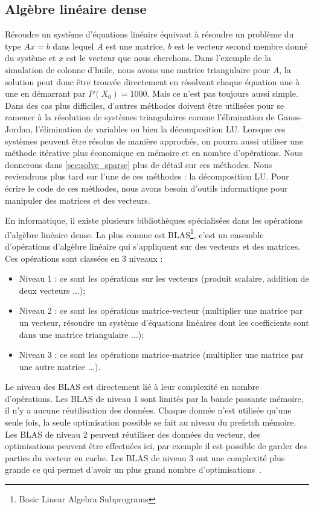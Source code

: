 \subsection{Algèbre linéaire dense}
Résoudre un système d'équations linéaire équivaut à résoudre un problème du type $Ax=b$ dans lequel $A$ est une matrice, $b$ est le vecteur second membre donné du système et $x$ est le vecteur que nous cherchons.
%
Dans l'exemple de la simulation de colonne d'huile, nous avons une matrice triangulaire pour $A$, la solution peut donc être trouvée directement en résolvant chaque équation une à une en démarrant par $P(X_0) = 1000$.
%
Mais ce n'est pas toujours aussi simple.
%
Dans des cas plus difficiles, d'autres méthodes doivent être utilisées pour se ramener à la résolution de systèmes triangulaires comme l'élimination de Gauss-Jordan, l'élimination de variables ou bien la décomposition LU.
%
Lorsque ces systèmes peuvent être résolus de manière approchés, on pourra aussi utiliser une méthode itérative plus économique en mémoire et en nombre d'opérations.
%
Nous donnerons dans \ref{sec:solve_sparse} plus de détail sur ces méthodes.
%
Nous reviendrons plus tard sur l'une de ces méthodes : la décomposition LU.
%
Pour écrire le code de ces méthodes, nous avons besoin d'outils informatique pour manipuler des matrices et des vecteurs.


En informatique, il existe plusieurs bibliothèques spécialisées dans les opérations d'algèbre linéaire dense.
%
La plus connue est BLAS\footnote{Basic Linear Algebra Subprograms}, c'est un ensemble d'opérations d'algèbre linéaire qui s'appliquent sur des vecteurs et des matrices.
%
Ces opérations sont classées en 3 niveaux :
\begin{itemize}
  \item Niveau 1 : ce sont les opérations sur les vecteurs (produit scalaire, addition de deux vecteurs ...);
  \item Niveau 2 : ce sont les opérations matrice-vecteur (multiplier une matrice par un vecteur, résoudre un système d'équations linéaires dont les coefficients sont dans une matrice triangulaire ...);
  \item Niveau 3 : ce sont les opérations matrice-matrice (multiplier une matrice par une autre matrice ...).
\end{itemize}
%
Le niveau des BLAS est directement lié à leur complexité en nombre d'opérations.
%
Les BLAS de niveau 1 sont limités par la bande passante mémoire, il n'y a aucune réutilisation des données.
%
Chaque donnée n'est utilisée qu'une seule fois, la seule optimisation possible se fait au niveau du prefetch mémoire.
%
Les BLAS de niveau 2 peuvent réutiliser des données du vecteur, des optimisations peuvent être effectuées ici, par exemple il est possible de garder des parties du vecteur en cache.
%
Les BLAS de niveau 3 ont une complexité plus grande ce qui permet d'avoir un plus grand nombre d'optimisations~\cite{blas3_opt}.


